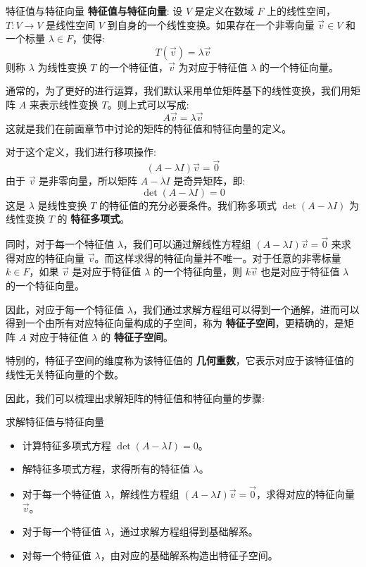\documentclass[a4paper,12pt]{ctexart}
\begin{document}
\begin{mydef}{特征值与特征向量}{}
\textbf{特征值与特征向量}: 设 $V$ 是定义在数域 $F$ 上的线性空间，$T: V \to V$ 是线性空间 $V$ 到自身的一个线性变换。如果存在一个非零向量 $\vec{v} \in V$ 和一个标量 $\lambda \in F$，使得:
\[
T(\vec{v}) = \lambda \vec{v}
\]
则称 $\lambda$ 为线性变换 $T$ 的一个特征值，$\vec{v}$ 为对应于特征值 $\lambda$ 的一个特征向量。

通常的，为了更好的进行运算，我们默认采用单位矩阵基下的线性变换，我们用矩阵 $A$ 来表示线性变换 $T$。则上式可以写成:
\[
A \vec{v} = \lambda \vec{v}
\]
这就是我们在前面章节中讨论的矩阵的特征值和特征向量的定义。

对于这个定义，我们进行移项操作: 
\[
(A - \lambda I) \vec{v} = \vec{0}
\]
由于 $\vec{v}$ 是非零向量，所以矩阵 $A - \lambda I$ 是奇异矩阵，即:
\[
\det(A - \lambda I) = 0
\]
这是 $\lambda$ 是线性变换 $T$ 的特征值的充分必要条件。我们称多项式 $\det(A - \lambda I)$ 为线性变换 $T$ 的 \textbf{特征多项式}。

同时，对于每一个特征值 $\lambda$，我们可以通过解线性方程组 $(A - \lambda I) \vec{v} = \vec{0}$ 来求得对应的特征向量 $\vec{v}$。而这样求得的特征向量并不唯一。对于任意的非零标量 $k \in F$，如果 $\vec{v}$ 是对应于特征值 $\lambda$ 的一个特征向量，则 $k \vec{v}$ 也是对应于特征值 $\lambda$ 的一个特征向量。

因此，对应于每一个特征值 $\lambda$，我们通过求解方程组可以得到一个通解，进而可以得到一个由所有对应特征向量构成的子空间，称为 \textbf{特征子空间}，更精确的，是矩阵 $A$ 对应于特征值 $\lambda$ 的 \textbf{特征子空间}。

特别的，特征子空间的维度称为该特征值的 \textbf{几何重数}，它表示对应于该特征值的线性无关特征向量的个数。
\end{mydef}

因此，我们可以梳理出求解矩阵的特征值和特征向量的步骤:

\newpage

\begin{myalgo}{求解特征值与特征向量}{}
\begin{itemize}
    \item 计算特征多项式方程 $\det(A - \lambda I) = 0$。
    \item 解特征多项式方程，求得所有的特征值 $\lambda$。
    \item 对于每一个特征值 $\lambda$，解线性方程组 $(A - \lambda I) \vec{v} = \vec{0}$，求得对应的特征向量 $\vec{v}$。
    \item 对于每一个特征值 $\lambda$，通过求解方程组得到基础解系。
    \item 对每一个特征值 $\lambda$，由对应的基础解系构造出特征子空间。
\end{itemize}
\end{myalgo}
\end{document}
